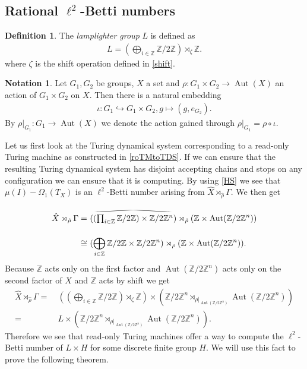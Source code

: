 \documentclass[12pt,a4paper]{scrartcl}
\theoremstyle{plain}
\theoremstyle{definition}
\newtheorem{Definition}[Theorem]{Definition}
\newtheorem{Notation}[Theorem]{Notation}
\newcommand{\Z}{\mathbb{Z}} %
\newcommand{\2}{\mathbb{Z} / 2 \mathbb{Z}}
\newcommand{\1}{\bar{1}}
\newcommand{\0}{\bar{0}}
\newcommand{\Aut}{\operatorname{Aut}}
\newcommand{\reallywidehat}[1]{\arraycolsep=0pt\relax%
	\begin{array}{c}
		\stretchto{
			\scaleto{
				\scalerel*[\widthof{\ensuremath{#1}}]{\kern-.5pt\bigwedge\kern-.5pt}
				{\rule[-\textheight/2]{1ex}{\textheight}} %
			}{\textheight} %
		}{0.5ex}\\           %
		#1\\                 %
		\rule{-1ex}{0ex}
	\end{array}
}
\begin{document}
\subsection{Rational $\ell^2$-Betti numbers} \label{sect_rat_numbers}
\begin{Definition}
	The \emph{lamplighter group} $L$ is defined as
	\begin{align*}
		L = (\bigoplus_{i \in \Z} \2) \rtimes_{\zeta} \Z.
	\end{align*}
	where $\zeta$ is the shift operation defined in \ref{shift}.
\end{Definition}
\begin{Notation}
	Let $G_1, G_2$ be groups, $X$ a set and $\rho \colon G_1 \times G_2 \to \Aut(X)$ an action of $G_1 \times G_2$ on $X$. Then there is a natural embedding 
	\begin{align*}
		\iota \colon G_1 \hookrightarrow G_1 \times G_2, g \mapsto (g, e_{G_2}).
	\end{align*}
	By $\rho|_{G_1} \colon G_1 \to \Aut(X)$ we denote the action gained through $ \rho|_{G_1} = \rho \circ \iota$.
\end{Notation}
Let us first look at the Turing dynamical system corresponding to a read-only Turing machine as constructed in \ref{roTMtoTDS}. If we can ensure that the resulting Turing dynamical system has disjoint accepting chains and stops on any configuration we can ensure that it is computing. By using \ref{HS} we see that $\mu (I) - \Omega_1(T_X)$ is an $\ell^2$-Betti number arising from $\hat{X} \rtimes_{\hat{\rho}} \Gamma$. We then get
\begin{align*}
	\hat{X} \rtimes_{\hat{\rho}} \Gamma =&~ (\reallywidehat{(\prod_{i \in \Z} \2) \times \2^n}) \rtimes_{\hat{\rho}} (\Z \times \Aut(\2^n)) \\
	\cong&~ (\bigoplus_{i \in \Z} \2 \times \2^n) \rtimes_{\rho} (\Z \times \Aut(\2^n)).
\end{align*}
Because $\Z$ acts only on the first factor and $\Aut(\2^n)$ acts only on the second factor of $X$ and $\Z$ acts by shift we get
\begin{align*}
	\hat{X} \rtimes_{\hat{\rho}} \Gamma =&~ ((\bigoplus_{i \in \Z} \2) \rtimes_{\zeta} \Z) \times (\2^n \rtimes_{\rho|_{\Aut(\2^n)}} \Aut(\2^n)) \\
	=&~ L \times (\2^n \rtimes_{\rho|_{\Aut(\2^n)}} \Aut(\2^n)).
\end{align*}
Therefore we see that read-only Turing machines offer a way to compute the $\ell^2$-Betti number of $L \times H$ for some discrete finite group $H$. We will use this fact to prove the following theorem.
\end{document}
